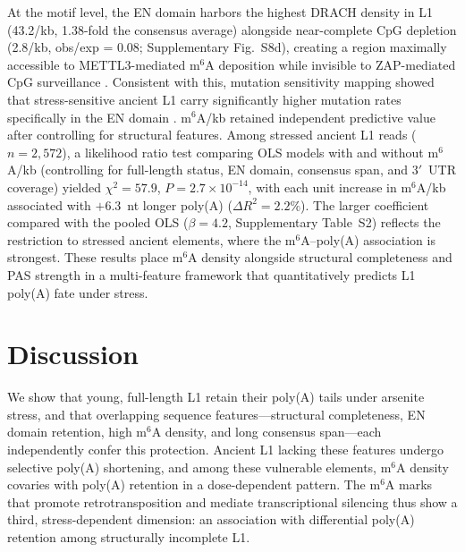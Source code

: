\documentclass[11pt]{article}
\newcommand{\msix}{m$^6$A}
\begin{document}
At the motif level, the EN domain harbors the highest DRACH density in
L1 (43.2/kb, 1.38-fold the consensus average) alongside near-complete
CpG depletion (2.8/kb, obs/exp = 0.08; Supplementary Fig.~S8d),
creating a region maximally accessible to METTL3-mediated \msix{}
deposition while invisible to ZAP-mediated CpG surveillance
\citep{Takata2017,Moldovan2015}. Consistent with this, mutation
sensitivity mapping showed that stress-sensitive ancient L1 carry
significantly higher mutation rates specifically in the EN domain
. \msix{}/kb retained independent predictive value after
controlling for structural features. Among stressed ancient L1 reads
($n = 2{,}572$), a likelihood ratio test comparing OLS models with and
without \msix{}/kb (controlling for full-length status, EN domain,
consensus span, and $3'$~UTR coverage) yielded $\chi^2 = 57.9$,
$P = 2.7 \times 10^{-14}$, with each unit increase in \msix{}/kb
associated with $+6.3$~nt longer poly(A) ($\Delta R^2 = 2.2\%$). The
larger coefficient compared with the pooled OLS
($\beta = 4.2$, Supplementary Table~S2) reflects the restriction to
stressed ancient elements, where the \msix{}--poly(A) association is
strongest. These results
place \msix{} density alongside structural completeness and PAS
strength in a multi-feature framework that quantitatively predicts L1
poly(A) fate under stress.


\section{Discussion}

We show that young, full-length L1 retain their poly(A) tails under
arsenite stress, and that overlapping sequence features---structural
completeness, EN domain retention, high \msix{} density, and long
consensus span---each independently confer this protection. Ancient L1
lacking these features undergo selective poly(A) shortening, and among
these vulnerable elements, \msix{} density covaries with poly(A)
retention in a dose-dependent pattern. The \msix{} marks that promote
retrotransposition \citep{Hwang2021} and mediate transcriptional
silencing \citep{Liu2021,Tian2024} thus show a third, stress-dependent
dimension: an association with differential poly(A) retention among
structurally incomplete L1.
\end{document}
